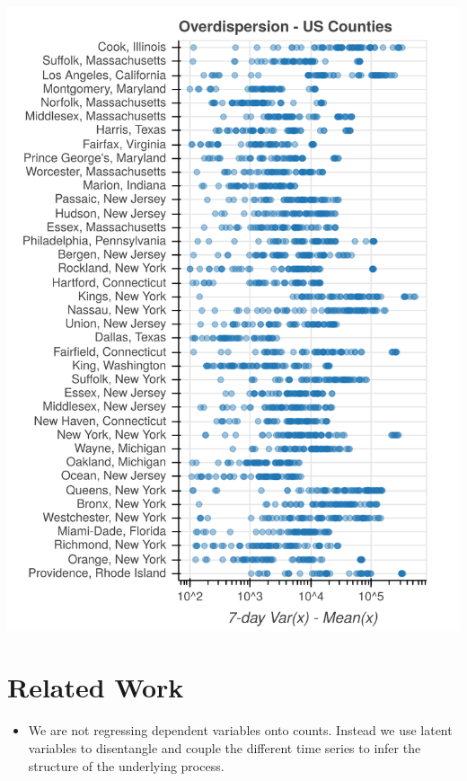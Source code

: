 \documentclass{article}
\begin{document}
\begin{minipage}{.45\linewidth}
\begin{center}
\includegraphics[width=\columnwidth]{img/overdispersion_counties.png}
\end{center}
\end{minipage}

\section{Related Work}
\label{sec:org4e138ff}
\cite{lloyd_smith2007negativebinomial}
\begin{itemize}
\item We are not regressing dependent variables onto counts. Instead we use latent
variables to disentangle and couple the different time series to infer the
structure of the underlying process.
\end{itemize}
\end{document}
